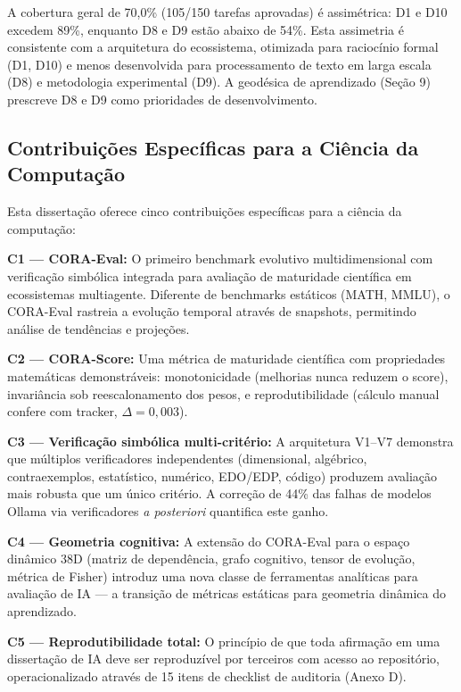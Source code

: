 A cobertura geral de 70,0\% (105/150 tarefas aprovadas) é assimétrica: D1 e
D10 excedem 89\%, enquanto D8 e D9 estão abaixo de 54\%. Esta assimetria é
consistente com a arquitetura do ecossistema, otimizada para raciocínio formal
(D1, D10) e menos desenvolvida para processamento de texto em larga escala
(D8) e metodologia experimental (D9). A geodésica de aprendizado (Seção 9)
prescreve D8 e D9 como prioridades de desenvolvimento.

\subsection{Contribuições Específicas para a Ciência da Computação}

Esta dissertação oferece cinco contribuições específicas para a ciência da
computação:

\textbf{C1 --- CORA-Eval:} O primeiro benchmark evolutivo multidimensional com
verificação simbólica integrada para avaliação de maturidade científica em
ecossistemas multiagente. Diferente de benchmarks estáticos (MATH, MMLU), o
CORA-Eval rastreia a evolução temporal através de snapshots, permitindo análise
de tendências e projeções.

\textbf{C2 --- CORA-Score:} Uma métrica de maturidade científica com
propriedades matemáticas demonstráveis: monotonicidade (melhorias nunca
reduzem o score), invariância sob reescalonamento dos pesos, e
reprodutibilidade (cálculo manual confere com tracker, $\Delta = 0,003$).

\textbf{C3 --- Verificação simbólica multi-critério:} A arquitetura V1--V7
demonstra que múltiplos verificadores independentes (dimensional, algébrico,
contraexemplos, estatístico, numérico, EDO/EDP, código) produzem avaliação
mais robusta que um único critério. A correção de 44\% das falhas de modelos
Ollama via verificadores \textit{a posteriori} quantifica este ganho.

\textbf{C4 --- Geometria cognitiva:} A extensão do CORA-Eval para o espaço
dinâmico 38D (matriz de dependência, grafo cognitivo, tensor de evolução,
métrica de Fisher) introduz uma nova classe de ferramentas analíticas para
avaliação de IA --- a transição de métricas estáticas para geometria dinâmica
do aprendizado.

\textbf{C5 --- Reprodutibilidade total:} O princípio de que toda afirmação
em uma dissertação de IA deve ser reproduzível por terceiros com acesso ao
repositório, operacionalizado através de 15 itens de checklist de auditoria
(Anexo D).


